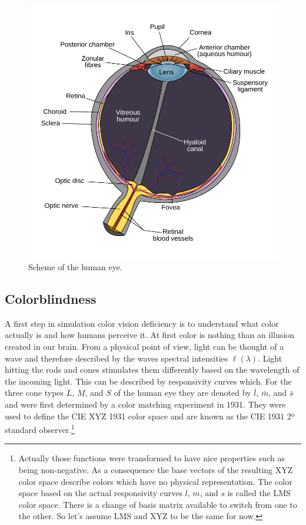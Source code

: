 \documentclass{sig-alternate-05-2015}
\begin{document}
\begin{figure}
    \centering
    \includegraphics[width=\columnwidth]{human_eye_scheme.pdf}
    \caption{Scheme of the human eye.}
    \label{fig:humaneye}
\end{figure}
%
%
\subsection{Colorblindness}
A first step in simulation color vision deficiency is to understand what color actually is and how humans perceive it.
At first color is nothing than an illusion created in our brain.
From a physical point of view, light can be thought of a wave and therefore described by the waves spectral intensities $\ell(\lambda)$.
Light hitting the rods and cones stimulates them differently based on the wavelength of the incoming light.
This can be described by responsivity curves which.
For the three cone types $L$, $M$, and $S$ of the human eye they are denoted by $\bar l$, $\bar m$, and $\bar s$ and were first determined by a color matching experiment in 1931.
They were used to define the CIE XYZ 1931 color space and are known as the CIE 1931 2º standard observer.\footnote{
    Actually those functions were transformed to have nice properties such as being non-negative.
    As a consequence the base vectors of the resulting XYZ color space describe colors which have no physical representation.
    The color space based on the actual responsivity curves $l$, $m$, and $s$ is called the LMS color space.
    There is a change of basis matrix available to switch from one to the other.
    So let's assume LMS and XYZ to be the same for now.
}
\end{document}
